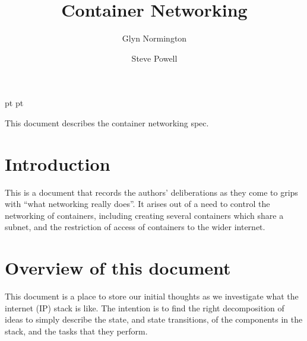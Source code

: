 \documentclass[a4paper,twoside,12pt]{article}
\begin{document}
 pt
 pt

\def\Slash{\slash\hspace{0pt}}

\title{Container Networking}

\author{
Glyn Normington\and
Steve Powell
}

\maketitle
\thispagestyle{empty}
\setcounter{page}{1}


This document describes the container networking spec.


\newcommand{\true}{true}
\newcommand{\false}{false}
\renewcommand{\emptyset}{\varnothing}

\clearpage
\tableofcontents

\cleardoublepage
{}
\setcounter{page}{1}

\section{Introduction}

This is a document that records the authors' deliberations as they come to grips with ``what networking really
does''. It arises out of a need to control the networking of containers, including creating several containers which share a subnet, and the restriction of access of containers to the wider internet.

\section{Overview of this document}

This document is a place to store our initial thoughts as we investigate what the internet (IP) stack is like. The intention is to find the right decomposition of ideas to simply describe the state, and state transitions, of the components in the stack, and the tasks that they perform.
\end{document}
